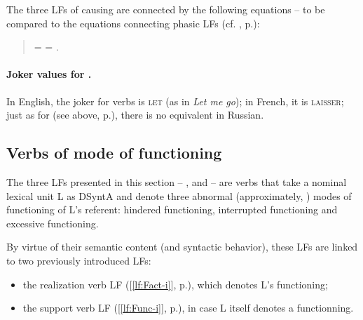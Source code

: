 The three LFs of causing are connected by the following equations -- to be compared to the equations connecting phasic LFs (cf. , p.\thinspace\pageref{txt:equationsPhasicLFs}):

\begin{quote}

 =  = .

\end{quote}

\paragraph*{Joker values for .}

In English, the joker  for verbs is \textsc{let}  (as in \textit{Let me go}); in French, it is \textsc{laisser}; just as for  (see above, p.\thinspace\pageref{para:jokerCaus}), there is no equivalent  in Russian.

\subsection{Verbs of mode of functioning}\label{sec:FLmodeFonct}

The three LFs presented in this section -- ,  and  -- are verbs that take a nominal lexical unit L as DSyntA\thinspace{} and denote three abnormal (approximately, ) modes of functioning of L's referent: hindered functioning, interrupted functioning and excessive functioning.

By virtue of their semantic content (and syntactic behavior), these LFs are linked to two previously introduced LFs:

\begin{itemize}

\item the realization verb LF  ([\ref{lf:Fact-i}], p.\thinspace\pageref{lf:Fact-i}), which denotes L's functioning;

\item the support verb LF  ([\ref{lf:Func-i}], p.\thinspace\pageref{lf:Func-i}), in case L itself denotes a functionning.

\end{itemize}

